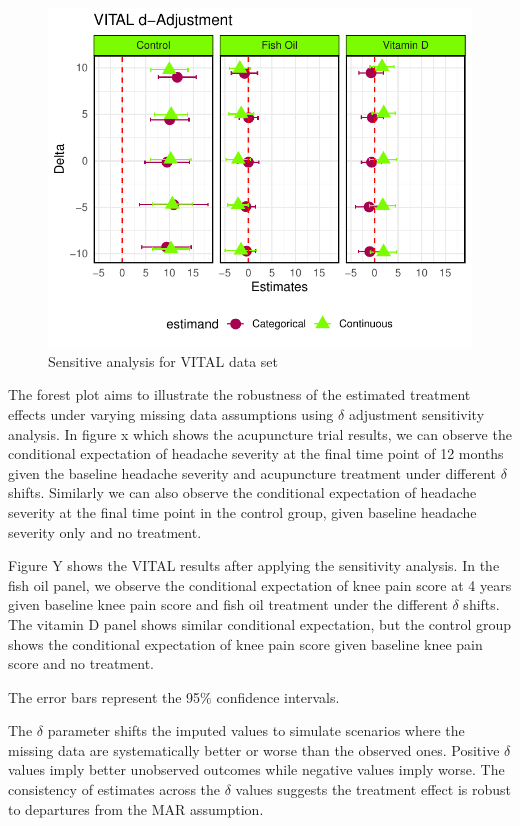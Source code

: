 \documentclass{article}
\newcommand{\pandocbounded}[1]{#1}
\begin{document}
\begin{figure}
\centering
\pandocbounded{\includegraphics[keepaspectratio]{Final_Report_files/figure-latex/unnamed-chunk-37-1.pdf}}
\caption{Sensitive analysis for VITAL data set}
\end{figure}

The forest plot aims to illustrate the robustness of the estimated
treatment effects under varying missing data assumptions using
\(\delta\) adjustment sensitivity analysis. In figure x which shows the
acupuncture trial results, we can observe the conditional expectation of
headache severity at the final time point of 12 months given the
baseline headache severity and acupuncture treatment under different
\(\delta\) shifts. Similarly we can also observe the conditional
expectation of headache severity at the final time point in the control
group, given baseline headache severity only and no treatment.

Figure Y shows the VITAL results after applying the sensitivity
analysis. In the fish oil panel, we observe the conditional expectation
of knee pain score at 4 years given baseline knee pain score and fish
oil treatment under the different \(\delta\) shifts. The vitamin D panel
shows similar conditional expectation, but the control group shows the
conditional expectation of knee pain score given baseline knee pain
score and no treatment.

The error bars represent the 95\% confidence intervals.

The \(\delta\) parameter shifts the imputed values to simulate scenarios
where the missing data are systematically better or worse than the
observed ones. Positive \(\delta\) values imply better unobserved
outcomes while negative values imply worse. The consistency of estimates
across the \(\delta\) values suggests the treatment effect is robust to
departures from the MAR assumption.
\end{document}
